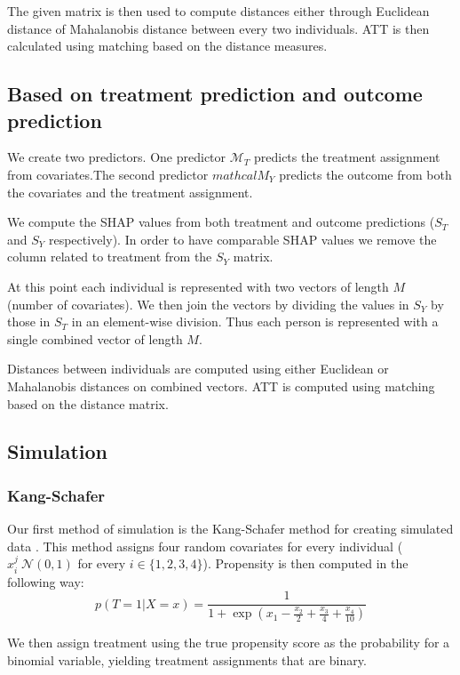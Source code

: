 \documentclass{article}
\begin{document}
The given matrix is then used to compute distances either through Euclidean distance of Mahalanobis distance between every two individuals. ATT is then calculated using matching based on the distance measures. 

\subsection{Based on treatment prediction and outcome prediction}
We create two predictors. One predictor $\mathcal{M}_T$ predicts the treatment assignment from covariates.The second predictor $mathcal{M}_Y$ predicts the outcome from both the covariates and the treatment assignment. 

We compute the SHAP values from both treatment and outcome predictions ($S_T$ and $S_Y$ respectively). In order to have comparable SHAP values we remove the column related to treatment from the $S_Y$ matrix. 

At this point each individual is represented with two vectors of length $M$ (number of covariates). We then join the vectors by dividing the values in $S_Y$ by those in $S_T$ in an element-wise division. Thus each person is represented with a single combined vector of length $M$.

Distances between individuals are computed using either Euclidean or Mahalanobis distances on combined vectors. ATT is computed using matching based on the distance matrix.

\subsection{Simulation}
\subsubsection{Kang-Schafer}
Our first method of simulation is the Kang-Schafer method for creating simulated data \cite{kang2007demystifying}. This method assigns four random covariates for every individual ($x_i^j~\mathcal{N}(0,1)$ for every $i\in{}\{1,2,3,4\}$). 
Propensity is then computed in the following way:
\begin{equation*}
    p(T=1| X=x) = \frac{1}{1 + \exp{(x_1 - \frac{x_2}{2} + \frac{x_3}{4} + \frac{x_4}{10})}}
\end{equation*}

We then assign treatment using the true propensity score as the probability for a binomial variable, yielding treatment assignments that are binary. 
\end{document}
